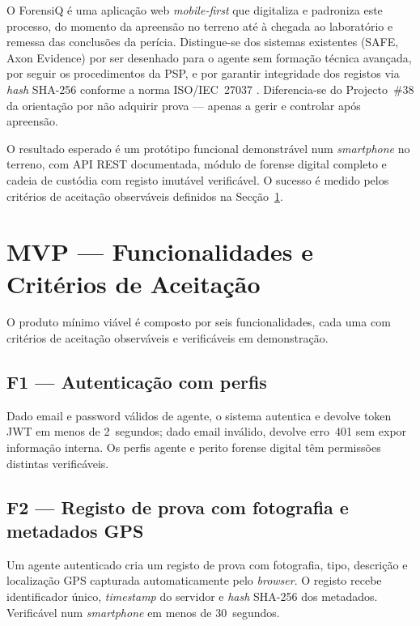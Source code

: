 \documentclass[a4paper,11pt]{article}
\begin{document}
O ForensiQ é uma aplicação web \emph{mobile-first} que digitaliza e padroniza
este processo, do momento da apreensão no terreno até à chegada ao laboratório e
remessa das conclusões da perícia. Distingue-se dos sistemas existentes (SAFE,
Axon Evidence) por ser desenhado para o agente sem formação técnica avançada, por
seguir os procedimentos da PSP, e por garantir integridade dos registos via
\emph{hash} SHA-256 conforme a norma ISO/IEC~27037
\citep{iso27037}. Diferencia-se do Projecto~\#38 da orientação
\citep{pestana2025} por não adquirir prova — apenas a gerir e controlar após
apreensão.

O resultado esperado é um protótipo funcional demonstrável num \emph{smartphone}
no terreno, com API REST documentada, módulo de forense digital completo e cadeia
de custódia com registo imutável verificável. O sucesso é medido pelos critérios
de aceitação observáveis definidos na Secção~\ref{sec:mvp}.

\section{MVP — Funcionalidades e Critérios de Aceitação}
\label{sec:mvp}

O produto mínimo viável é composto por seis funcionalidades, cada uma com
critérios de aceitação observáveis e verificáveis em demonstração.

\subsection{F1 — Autenticação com perfis}

Dado email e password válidos de agente, o sistema autentica e devolve token JWT
em menos de 2~segundos; dado email inválido, devolve erro~401 sem expor
informação interna. Os perfis agente e perito forense digital têm permissões
distintas verificáveis.

\subsection{F2 — Registo de prova com fotografia e metadados GPS}

Um agente autenticado cria um registo de prova com fotografia, tipo, descrição e
localização GPS capturada automaticamente pelo \emph{browser}. O registo recebe
identificador único, \emph{timestamp} do servidor e \emph{hash} SHA-256 dos
metadados. Verificável num \emph{smartphone} em menos de 30~segundos.
\end{document}
